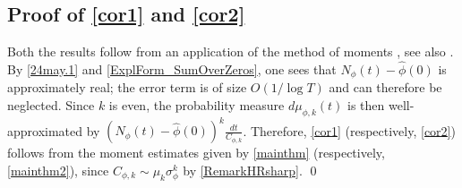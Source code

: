 \documentclass[12pt,oneside,english,a4paper]{amsart}
\theoremstyle{remark}
\numberwithin{equation}{section}
\begin{document}
\subsection*{Proof of \texorpdfstring{\cref{cor1}}{cor1} and \texorpdfstring{\cref{cor2}}{cor2} }

Both the results follow from an application of the method of moments \cite[Section 30]{Billingsley}, see also \cite[Section B.5]{Kowalski1}. By \eqref{24may.1} and \cref{ExplForm_SumOverZeros}, one sees that $N_\phi(t) - \hat\phi(0)$ is approximately real; the error term is of size $O(1/\log T)$ and can therefore be neglected. Since $k$ is even, the probability measure $d\mu_{\phi,k}(t)$ is then well-approximated by $(N_\phi(t) - \hat\phi(0))^k \frac{dt}{C_{\phi,k}}$. Therefore, \cref{cor1} (respectively, \cref{cor2}) follows from the moment estimates given by \cref{mainthm} (respectively, \cref{mainthm2}), since $C_{\phi,k}\sim \mu_k \sigma_\phi^k$ by \cref{RemarkHRsharp}.
\qed












\end{document}
